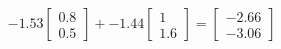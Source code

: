 \documentclass[preview]{standalone}
\begin{document}
\begin{align*}
-1.53 \begin{bmatrix} 0.8 \\ 0.5 \end{bmatrix} + -1.44 \begin{bmatrix} 1 \\ 1.6 \end{bmatrix} = \begin{bmatrix} -2.66 \\ -3.06 \end{bmatrix}
\end{align*}
\end{document}
